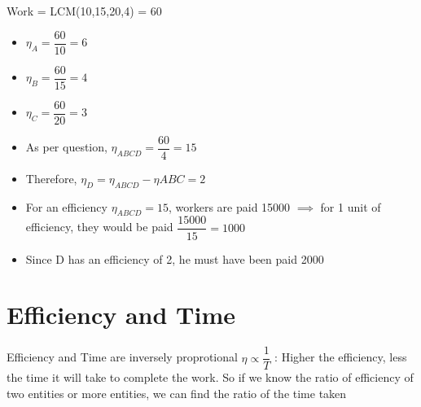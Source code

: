
Work = LCM(10,15,20,4) = 60

\begin{multicols}{2}
    \begin{itemize}
        \item $\eta_A = \dfrac{60}{10} = 6$
        \item $\eta_B = \dfrac{60}{15} = 4$
        \item $\eta_C = \dfrac{60}{20} = 3$
    \end{itemize}
    
    \columnbreak

    \begin{itemize}
        \item As per question, $\eta_{ABCD} = \dfrac{60}{4} = 15$
        \item Therefore, $\eta_D = \eta_{ABCD} - \eta{ABC} = 2$
    \end{itemize}
\end{multicols}

\begin{itemize}

    \item For an efficiency $\eta_{ABCD} = 15$, workers are paid 15000 $\implies$ for 1 unit of efficiency, they would be paid $\dfrac{15000}{15} = 1000$

    \item Since D has an efficiency of 2, he must have been paid 2000
\end{itemize}

\newpage
\section{Efficiency and Time}

Efficiency and Time are inversely proprotional $\eta \propto \dfrac{1}{T}$ : Higher the efficiency, less the time it will take to complete the work. So if we know the ratio of efficiency of two entities or more entities, we can find the ratio of the time taken 

